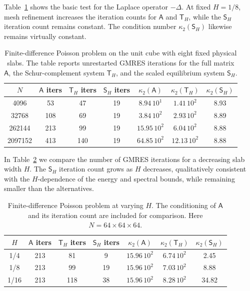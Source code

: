 \documentclass[final,onefignum,onetabnum]{siamart250211}
\newcommand{\mtx}[1]{\bm{\mathsf{#1}}}
\theoremstyle{definition}
\begin{document}
Table~\ref{tab:fd_poisson_fixedH} shows the basic test for the Laplace operator $-\Delta$. At fixed $H=1/8$, mesh refinement increases the iteration counts for $\mtx{A}$ and $\mtx{T}_H$, while the $\mtx{S}_H$ iteration count remains constant. The condition number $\kappa_2(\mtx{S}_H)$ likewise remains virtually constant.
\begin{table}[H]
\centering
\begin{tabular}{c|ccc|ccc}
$N$ & $\mtx{A}$ iters & $\mtx{T}_{H}$ iters & $\mtx{S}_{H}$ iters & $\kappa_2(\mtx{A})$ & $\kappa_2(\mtx{T}_{H})$ & $\kappa_2(\mtx{S}_{H})$\\
\hline
4096 & 53 & 47 & 19 & $8.94\,10^{1}$ & $1.41\,10^{2}$ & 8.93\\
32768 & 108 & 69 & 19 & $3.84\,10^{2}$ & $2.93\,10^{2}$ & 8.89\\
262144 & 213 & 99 & 19 & $15.95\,10^{2}$ & $6.04\,10^{2}$ & 8.88\\
2097152 & 413 & 140 & 19 & $64.85\,10^{2}$ & $12.13\,10^{2}$ & 8.88
\end{tabular}
\caption{Finite-difference Poisson problem on the unit cube with eight fixed physical slabs.  The table reports unrestarted GMRES iterations for the full matrix $\mtx{A}$, the Schur-complement system $\mtx{T}_{H}$, and the scaled equilibrium system $\mtx{S}_H$.}
\label{tab:fd_poisson_fixedH}
\end{table}
In Table~\ref{tab:fd_shrinkingH} we compare the number of GMRES iterations for a decreasing slab width $H$. 
The $\mtx{S}_{H}$ iteration count grows as $H$ decreases, qualitatively consistent with the $H$-dependence of the energy and spectral bounds, while remaining smaller than the alternatives.
\begin{table}[H]
\centering
\begin{tabular}{c|ccc|ccc}
$H$ & $\mtx{A}$ iters & $\mtx{T}_{H}$ iters & $\mtx{S}_{H}$ iters & $\kappa_2(\mtx{A})$ & $\kappa_2(\mtx{T}_{H})$ & $\kappa_2(\mtx{S}_{H})$\\
\hline
1/4 & 213 & 81 & 9 & $15.96\,10^{2}$ & $6.74\,10^{2}$ & 2.45\\
1/8 & 213 & 99 & 19 & $15.96\,10^{2}$ & $7.03\,10^{2}$ & 8.88\\
1/16 & 213 & 118 & 38 & $15.96\,10^{2}$ & $8.28\,10^{2}$ & 34.82
\end{tabular}
\caption{Finite-difference Poisson problem at varying $H$. The conditioning of $\mtx{A}$ and its iteration count are included for comparison. Here $N = 64\times64\times 64$.}
\label{tab:fd_shrinkingH}
\end{table}
\end{document}
